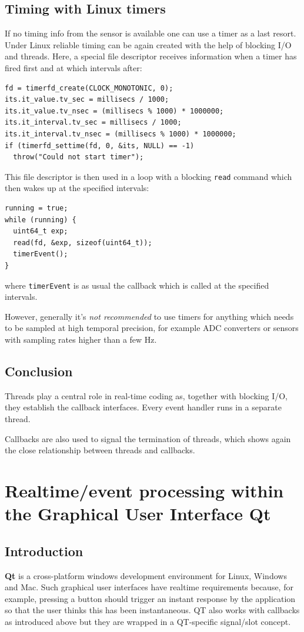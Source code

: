 \documentclass[12pt]{report}
\begin{document}
\section{Timing with Linux timers}
If no timing info from the sensor is available
one can use a timer as a last resort. Under Linux reliable timing
can be again created with the help of blocking I/O
and threads. Here, a
special file descriptor receives information when a timer
has fired first and at which intervals
after:
\begin{verbatim}
fd = timerfd_create(CLOCK_MONOTONIC, 0);
its.it_value.tv_sec = millisecs / 1000;
its.it_value.tv_nsec = (millisecs % 1000) * 1000000;
its.it_interval.tv_sec = millisecs / 1000;
its.it_interval.tv_nsec = (millisecs % 1000) * 1000000;
if (timerfd_settime(fd, 0, &its, NULL) == -1)
  throw("Could not start timer");
\end{verbatim}
This file descriptor is then used
in a loop with a blocking \texttt{read} command which then
wakes up at the specified intervals:
\begin{verbatim}
running = true;
while (running) {
  uint64_t exp;
  read(fd, &exp, sizeof(uint64_t));
  timerEvent();
}
\end{verbatim}
where \texttt{timerEvent} is as usual the callback which is
called at the specified intervals.

However, generally it's \textsl{not recommended}
to use timers for anything which needs to be sampled at high temporal
precision, for
example ADC converters or sensors with sampling rates higher than a
few Hz.

\section{Conclusion}
Threads play a central role in real-time coding as,
together with blocking I/O, they establish
the callback interfaces. Every event handler
runs in a separate thread.

Callbacks are also used to signal the termination of
threads, which shows again the close relationship between threads
and callbacks.



\chapter{Realtime/event processing within the Graphical User Interface Qt\label{qt}}

\section{Introduction}
\textbf{Qt} is a cross-platform windows development environment for
Linux, Windows and Mac. Such graphical user interfaces have realtime
requirements because, for example, pressing a button should trigger an
instant response by the application so that the user thinks this has
been instantaneous. QT also works with callbacks as introduced above
but they are wrapped in a QT-specific signal/slot concept.
\end{document}
